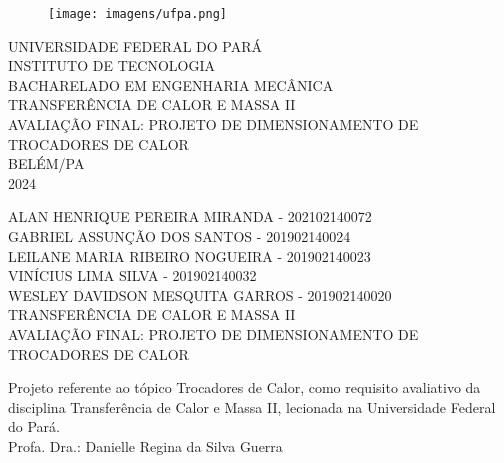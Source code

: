 \thispagestyle{empty}

\begin{center}
	\begin{figure}[h]
  \centering
		\texttt{[image: imagens/ufpa.png]}
		\label{fig:ufpa}
	\end{figure}
	
	
	\vspace{1cm}
	\large \uppercase{UNIVERSIDADE FEDERAL DO PARÁ}\\
	\large \uppercase{INSTITUTO DE TECNOLOGIA}\\
	\large \uppercase{BACHARELADO EM ENGENHARIA MECÂNICA}\\
	\vspace{6cm}
	\large \uppercase{TRANSFERÊNCIA DE CALOR E MASSA II}\\
	\vspace{1cm}
	\large \uppercase {AVALIAÇÃO FINAL: PROJETO DE DIMENSIONAMENTO DE TROCADORES DE CALOR} \\
	\vspace{7cm}
	\large {BELÉM/PA \\ 2024}

 \newpage
 \thispagestyle{empty}
 \large \uppercase{alan henrique pereira miranda - 202102140072}\\
 \large \uppercase{GABRIEL ASSUNÇÃO DOS SANTOS - 201902140024}\\
 \large \uppercase{LEILANE MARIA RIBEIRO NOGUEIRA - 201902140023}\\
 \large \uppercase{VINÍCIUS LIMA SILVA - 201902140032	}\\
 \large \uppercase{WESLEY DAVIDSON MESQUITA GARROS - 201902140020}\\
 \vspace{3cm}
	\large \uppercase{TRANSFERÊNCIA DE CALOR E MASSA II}\\
\vspace{1cm}
\large \uppercase {AVALIAÇÃO FINAL: PROJETO DE DIMENSIONAMENTO DE TROCADORES DE CALOR} \\
 \vspace{1cm}
 \singlespacing
 \hspace{8cm} %
 \begin{minipage}{7cm}
	Projeto referente ao tópico Trocadores de Calor, como requisito avaliativo da disciplina Transferência de Calor e Massa II, lecionada na Universidade Federal do Pará. \\
	
	Profa. Dra.: Danielle Regina da Silva Guerra
	\vspace{1cm}
	

\end{minipage}
\end{center}
